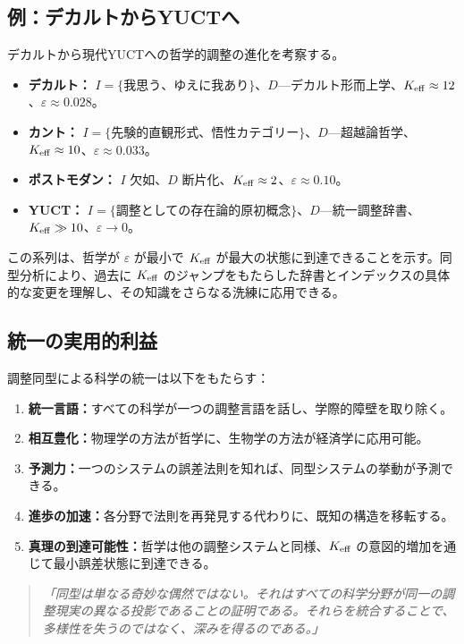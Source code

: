 \documentclass[11pt,a4paper]{article}
\newcommand{\eps}{\varepsilon}
\begin{document}
	\subsection{例：デカルトからYUCTへ}
	
	デカルトから現代YUCTへの哲学的調整の進化を考察する。
	
	\begin{itemize}
		\item \textbf{デカルト：} \(I = \{\textit{我思う、ゆえに我あり}\}\)、\(D\)—デカルト形而上学、\(\Keff \approx 12\)、\(\eps \approx 0.028\)。
		\item \textbf{カント：} \(I = \{\text{先験的直観形式、悟性カテゴリー}\}\)、\(D\)—超越論哲学、\(\Keff \approx 10\)、\(\eps \approx 0.033\)。
		\item \textbf{ポストモダン：} \(I\) 欠如、\(D\) 断片化、\(\Keff \approx 2\)、\(\eps \approx 0.10\)。
		\item \textbf{YUCT：} \(I = \{\text{調整としての存在論的原初概念}\}\)、\(D\)—統一調整辞書、\(\Keff \gg 10\)、\(\eps \to 0\)。
	\end{itemize}
	
	この系列は、哲学が \(\eps\) が最小で \(\Keff\) が最大の状態に到達できることを示す。同型分析により、過去に \(\Keff\) のジャンプをもたらした辞書とインデックスの具体的な変更を理解し、その知識をさらなる洗練に応用できる。
	
	\subsection{統一の実用的利益}
	
	調整同型による科学の統一は以下をもたらす：
	
	\begin{enumerate}
		\item \textbf{統一言語：}すべての科学が一つの調整言語を話し、学際的障壁を取り除く。
		\item \textbf{相互豊化：}物理学の方法が哲学に、生物学の方法が経済学に応用可能。
		\item \textbf{予測力：}一つのシステムの誤差法則を知れば、同型システムの挙動が予測できる。
		\item \textbf{進歩の加速：}各分野で法則を再発見する代わりに、既知の構造を移転する。
		\item \textbf{真理の到達可能性：}哲学は他の調整システムと同様、\(\Keff\) の意図的増加を通じて最小誤差状態に到達できる。
	\end{enumerate}
	
	\begin{quote}
		\itshape
		「同型は単なる奇妙な偶然ではない。それはすべての科学分野が同一の調整現実の異なる投影であることの証明である。それらを統合することで、多様性を失うのではなく、深みを得るのである。」
	\end{quote}
	
\end{document}
